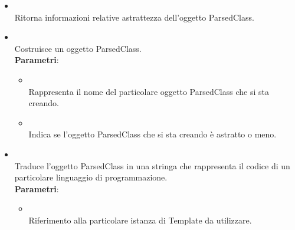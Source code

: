 \begin{itemize}
\begin{itemize}
\item {}
\\ Ritorna informazioni relative astrattezza dell'oggetto ParsedClass.
\item {}
\\ Costruisce un oggetto ParsedClass.
\\ \textbf{Parametri}:
\begin{itemize}
\item {}
\\ Rappresenta il nome del particolare oggetto ParsedClass che si sta creando.
\item {}
\\ Indica se l'oggetto ParsedClass che si sta creando è astratto o meno.
\end{itemize}
\item {}
\\ Traduce l'oggetto ParsedClass in una stringa che rappresenta il codice di un particolare linguaggio di programmazione.
\\ \textbf{Parametri}:
\begin{itemize}
\item {}
\\ Riferimento alla particolare istanza di Template da utilizzare.
\end{itemize}
\end{itemize}
\end{itemize}

